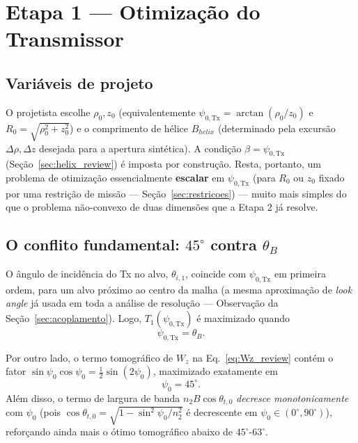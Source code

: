 \documentclass[12pt,a4paper,oneside]{book}
\theoremstyle{definition}
\theoremstyle{remark}
\newcommand{\thetaB}{\theta_B}
\newcommand{\ndos}{n_2}
\newcommand{\psiT}{\psi_{0,\mathrm{Tx}}}
\begin{document}
\chapter{Etapa 1 --- Otimização do Transmissor}
\label{cap:etapa1}

\section{Variáveis de projeto}

O projetista escolhe $\rho_0,z_0$ (equivalentemente $\psiT=\arctan(\rho_0/z_0)$
e $R_0=\sqrt{\rho_0^2+z_0^2}$) e o comprimento de hélice $B_{helix}$
(determinado pela excursão $\Delta\rho,\Delta z$ desejada para a apertura
sintética). A condição $\beta=\psiT$ (Seção~\ref{sec:helix_review}) é
imposta por construção. Resta, portanto, um problema de otimização
essencialmente \textbf{escalar} em $\psiT$ (para $R_0$ ou $z_0$ fixado por
uma restrição de missão — Seção~\ref{sec:restricoes}) — muito mais simples
do que o problema não-convexo de duas dimensões que a Etapa 2 já resolve.

\section{O conflito fundamental: $45^\circ$ contra $\thetaB$}
\label{sec:conflito}

O ângulo de incidência do Tx no alvo, $\theta_{i,1}$, coincide com $\psiT$
em primeira ordem, para um alvo próximo ao centro da malha (a mesma
aproximação de \textit{look angle} já usada em toda a análise de resolução
— Observação da Seção~\ref{sec:acoplamento}). Logo, $T_1(\psiT)$ é
maximizado quando
\begin{equation}
  \psiT = \thetaB.
  \label{eq:otimo_potencia}
\end{equation}

Por outro lado, o termo tomográfico de $W_z$ na
Eq.~\eqref{eq:Wz_review} contém o fator $\sin\psi_0\cos\psi_0
=\tfrac12\sin(2\psi_0)$, maximizado exatamente em
\begin{equation}
  \psi_0 = 45^\circ.
  \label{eq:otimo_tomografico}
\end{equation}
Além disso, o termo de largura de banda $\ndos B\cos\theta_{t,0}$
\emph{decresce monotonicamente} com $\psi_0$ (pois
$\cos\theta_{t,0}=\sqrt{1-\sin^2\psi_0/\ndos^2}$ é decrescente em
$\psi_0\in(0^\circ,90^\circ)$), reforçando ainda mais o ótimo tomográfico abaixo de
$45^\circ$-$63^\circ$.
\end{document}
